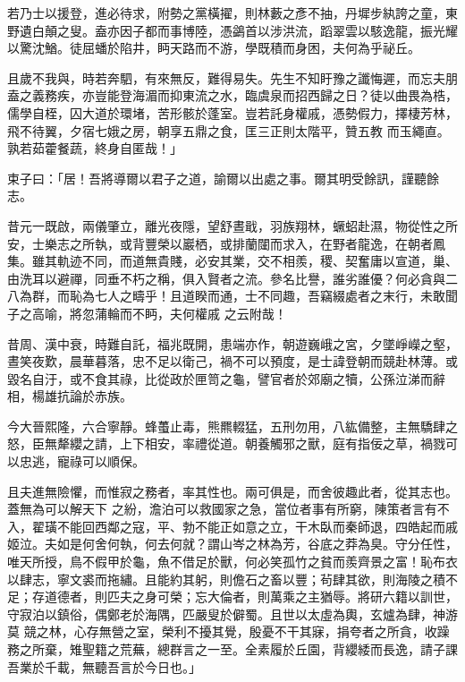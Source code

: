 \begin{pinyinscope}
 若乃士以援登，進必待求，附勢之黨橫擢，則林藪之彥不抽，丹墀步紈誇之童，東野遺白顛之叟。盍亦因子都而事博陸，憑鷁首以涉洪流，蹈翠雲以駭逸龍，振光耀以驚沈鰌。徒屈蟠於陷井，眄天路而不游，學既積而身困，夫何為乎祕丘。



 且歲不我與，時若奔駟，有來無反，難得易失。先生不知盱豫之讖悔遲，而忘夫朋盍之義務疾，亦豈能登海湄而抑東流之水，臨虞泉而招西歸之日？徒以曲畏為梏，儒學自桎，囚大道於環堵，苦形骸於蓬室。豈若託身權戚，憑勢假力，擇棲芳林，飛不待翼，夕宿七娥之房，朝享五鼎之食，匡三正則太階平，贊五教
 而玉繩直。孰若茹藿餐蔬，終身自匿哉！」



 束子曰：「居！吾將導爾以君子之道，諭爾以出處之事。爾其明受餘訊，謹聽餘志。



 昔元一既啟，兩儀肇立，離光夜隱，望舒晝戢，羽族翔林，蟩蛁赴濕，物從性之所安，士樂志之所執，或背豐榮以巖栖，或排蘭闥而求入，在野者龍逸，在朝者鳳集。雖其軌迹不同，而道無貴賤，必安其業，交不相羨，稷、契奮庸以宣道，巢、由洗耳以避禪，同垂不朽之稱，俱入賢者之流。參名比譽，誰劣誰優？何必貪與二八為群，而恥為七人之疇乎！且道睽而通，士不同趣，吾竊綴處者之末行，未敢聞子之高喻，將忽蒲輪而不眄，夫何權戚
 之云附哉！



 昔周、漢中衰，時難自託，福兆既開，患端亦作，朝遊巍峨之宮，夕墜崢嶸之壑，晝笑夜歎，晨華暮落，忠不足以衛己，禍不可以預度，是士諱登朝而競赴林薄。或毀名自汙，或不食其祿，比從政於匣笥之龜，譬官者於郊廟之犢，公孫泣涕而辭相，楊雄抗論於赤族。



 今大晉熙隆，六合寧靜。蜂蠆止毒，熊羆輟猛，五刑勿用，八紘備整，主無驕肆之怒，臣無犛纓之請，上下相安，率禮從道。朝養觸邪之獸，庭有指佞之草，禍戮可以忠逃，寵祿可以順保。



 且夫進無險懼，而惟寂之務者，率其性也。兩可俱是，而舍彼趣此者，從其志也。蓋無為可以解天下
 之紛，澹泊可以救國家之急，當位者事有所窮，陳策者言有不入，翟璜不能回西鄰之寇，平、勃不能正如意之立，干木臥而秦師退，四皓起而戚姬泣。夫如是何舍何執，何去何就？謂山岑之林為芳，谷底之莽為臭。守分任性，唯天所授，鳥不假甲於龜，魚不借足於獸，何必笑孤竹之貧而羨齊景之富！恥布衣以肆志，寧文裘而拖繡。且能約其躬，則儋石之畜以豐；茍肆其欲，則海陵之積不足；存道德者，則匹夫之身可榮；忘大倫者，則萬乘之主猶辱。將研六籍以訓世，守寂泊以鎮俗，偶鄭老於海隅，匹嚴叟於僻蜀。且世以太虛為輿，玄爐為肆，神游莫
 競之林，心存無營之室，榮利不擾其覺，殷憂不干其寐，捐夸者之所貪，收躁務之所棄，雉聖籍之荒蕪，總群言之一至。全素履於丘園，背纓緌而長逸，請子課吾業於千載，無聽吾言於今日也。」




\end{pinyinscope}
